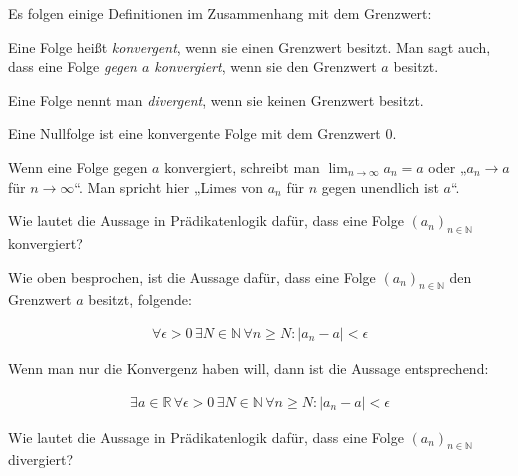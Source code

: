 \documentclass[fontsize=9pt,
               parskip=half-,
               DIV=14,
               listof=chapterentry,
               tocflat]{scrbook}
\begin{document}
Es folgen einige Definitionen im Zusammenhang mit dem Grenzwert:

\begin{description}[style=nextline]
\item[Konvergenz]
Eine Folge heißt \emph{konvergent}, wenn sie einen Grenzwert besitzt. Man sagt auch, dass eine Folge \emph{gegen $a$ konvergiert}, wenn sie den Grenzwert $a$ besitzt.\item[Divergenz]
Eine Folge nennt man \emph{divergent}, wenn sie keinen Grenzwert besitzt.\item[Nullfolge]
Eine Nullfolge ist eine konvergente Folge mit dem Grenzwert $0$.\end{description}

Wenn eine Folge gegen $a$ konvergiert, schreibt man $\lim _{n\to \infty }a_{n}=a$ oder „$a_{n}\rightarrow a$ für $n\rightarrow \infty $“. Man spricht hier „Limes von $a_{n}$ für $n$ gegen unendlich ist $a$“.

\begin{mdframed}[style=semanticbox,frametitleaboveskip=3pt,innerbottommargin=3pt,frametitle=Frage]
Wie lautet die Aussage in Prädikatenlogik dafür, dass eine Folge $(a_{n})_{n\in \mathbb {N} }$ konvergiert?

\end{mdframed}

\begin{answer*}
Wie oben besprochen, ist die Aussage dafür, dass eine Folge $(a_{n})_{n\in \mathbb {N} }$ den Grenzwert $a$ besitzt, folgende:

\begin{align*}
\forall \epsilon >0\,\exists N\in \mathbb {N} \,\forall n\geq N:|a_{n}-a|<\epsilon 
\end{align*}

Wenn man nur die Konvergenz haben will, dann ist die Aussage entsprechend:

\begin{align*}
\exists a\in \mathbb {R} \,\forall \epsilon >0\,\exists N\in \mathbb {N} \,\forall n\geq N:|a_{n}-a|<\epsilon 
\end{align*}

\end{answer*}

\begin{mdframed}[style=semanticbox,frametitleaboveskip=3pt,innerbottommargin=3pt,frametitle=Frage]
Wie lautet die Aussage in Prädikatenlogik dafür, dass eine Folge $(a_{n})_{n\in \mathbb {N} }$ divergiert?

\end{mdframed}
\end{document}
